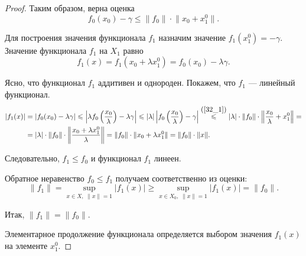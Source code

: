 \documentclass[12pt,a4paper,titlepage,oneside]{book}
\theoremstyle{definition}
\theoremstyle{plain}
\theoremstyle{break}
\theoremstyle{remark}
\theoremstyle{remark}
\theoremstyle{remark}
\theoremstyle{remark}
\theoremstyle{plain}
\theoremstyle{plain}
\begin{document}
\begin{proof}
Таким образом, верна оценка
\begin{equation}
\label{32_1}
f_0(x_0)-\gamma \leqslant \lVert f_0 \rVert \cdot \lVert x_0+x_1^0 \rVert.
\end{equation}

Для построения значения функционала $f_1$ назначим значение $f_1(x_1^0)=-\gamma$. Значение функционала $f_1$ на $X_1$ равно
$$ f_1(x)=f_1(x_0+ \lambda x_1^0)=f_0(x_0)-\lambda \gamma.$$

Ясно, что функционал $f_1$ аддитивен и однороден. Покажем, что $f_1$ --- линейный функционал.
\begin{align*}
|f_1(x)| &= |f_0(x_0)-\lambda \gamma| \leqslant \left|\lambda f_0\left(\frac{x_0}{\lambda}\right)-\lambda \gamma\right| \leqslant
|\lambda| \left|f_0\left(\frac{x_0}{\lambda}\right)- \gamma\right| \overset{\mbox{(\ref{32_1})}}{\leqslant} |\lambda|\cdot \lVert f_0 \rVert \cdot \left \lVert \frac{x_0}{\lambda} + x_1^0 \right \rVert =\\
&= \lvert \lambda \rvert \cdot \lVert f_0 \rVert \cdot \left \lVert \frac{x_0+\lambda x_1^0}{\lambda} \right \rVert = \lVert f_0 \rVert \cdot  \lVert x_0+\lambda x_1^0 \rVert = \lVert f_0 \rVert \cdot  \lVert x \rVert.
\end{align*}

Следовательно, $f_1 \leqslant f_0$ и функционал $f_1$ линеен.

Обратное неравенство $f_0 \leqslant f_1$ получаем соответственно из оценки:
$$ \lVert f_1 \rVert=\underset{x \in X, \; \lVert x \rVert = 1 }{\sup} |f_1(x)| \geqslant \underset{x \in X_0, \; \lVert x \rVert = 1 }{\sup} |f_1(x)|=\lVert f_0 \rVert.$$

Итак, $\lVert f_1 \rVert=\lVert f_0 \rVert$.

Элементарное продолжение функционала определяется выбором значения $f_1(x)$ на элементе $x_1^0$.
\end{proof}
\end{document}

